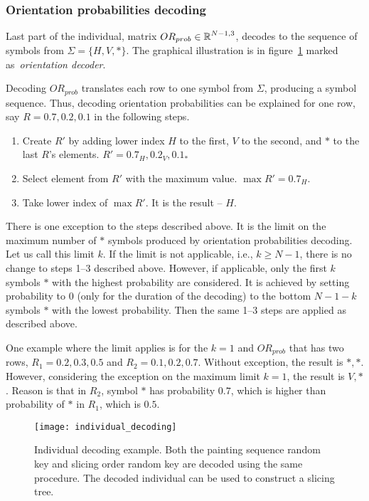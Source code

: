 \subsubsection*{Orientation probabilities decoding}

Last part of the individual, matrix $OR_{prob} \in \operatorname*{\mathbb{R}}^{N-1, 3}$, decodes to the sequence of symbols from $\Sigma = \{H, V, *\} $.
The graphical illustration is in figure~\ref{fig:individual-decoding} marked as~\textit{orientation decoder}.

Decoding $OR_{prob}$ translates each row to one symbol from $\Sigma$, producing a symbol sequence.
Thus, decoding orientation probabilities can be explained for one row, say $R = 0.7, 0.2, 0.1$
in the following steps.


\begin{enumerate}
    \item Create $R'$ by adding lower index $H$ to the first, $V$ to the second, and $*$ to the last $R$'s elements.
    $R' = 0.7_H, 0.2_V, 0.1_*$
    \item Select element from $R'$ with the maximum value. $\max R' = 0.7_H$.
    \item Take lower index of $\max R'$.
    It is the result – $H$.
\end{enumerate}

There is one exception to the steps described above.
It is the limit on the maximum number of $*$ symbols produced by orientation probabilities decoding.
Let us call this limit $k$.
If the limit is not applicable, i.e., $k \geq N-1$, there is no change to steps 1--3 described above.
However, if applicable, only the first $k$ symbols $*$ with the highest probability are considered.
It is achieved by setting probability to $0$ (only for the duration of the decoding) to the bottom $N-1-k$ symbols $*$ with the lowest probability.
Then the same 1--3 steps are applied as described above.

One example where the limit applies is for the $k=1$ and $OR_{prob}$ that has two rows, $R_1 = 0.2, 0.3, 0.5$ and $R_2 = 0.1, 0.2, 0.7$.
Without exception, the result is $*, *$.
However, considering the exception on the maximum limit $k=1$, the result is $V, *$.
Reason is that in $R_2$, symbol $*$ has probability $0.7$,
which is higher than probability of $*$ in $R_1$, which is $0.5$.



\begin{figure}[htp]
    \texttt{[image: individual\_decoding]}
    \caption{
        Individual decoding example. Both the painting sequence random key and slicing order random key
        are decoded using the same procedure. The decoded individual can be used to construct a slicing tree.
    }
    \label{fig:individual-decoding}
\end{figure}

